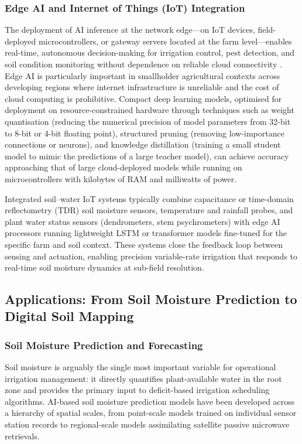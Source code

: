 \documentclass[land,article,submit,pdftex,moreauthors]{Definitions/mdpi}
\numberwithin{equation}{section}
\begin{document}
\subsubsection{Edge AI and Internet of Things (IoT) Integration}

The deployment of AI inference at the network edge---on IoT devices, field-deployed microcontrollers, or gateway servers located at the farm level---enables real-time, autonomous decision-making for irrigation control, pest detection, and soil condition monitoring without dependence on reliable cloud connectivity \citep{vij2020iot}. Edge AI is particularly important in smallholder agricultural contexts across developing regions where internet infrastructure is unreliable and the cost of cloud computing is prohibitive. Compact deep learning models, optimised for deployment on resource-constrained hardware through techniques such as weight quantisation (reducing the numerical precision of model parameters from 32-bit to 8-bit or 4-bit floating point), structured pruning (removing low-importance connections or neurons), and knowledge distillation (training a small student model to mimic the predictions of a large teacher model), can achieve accuracy approaching that of large cloud-deployed models while running on microcontrollers with kilobytes of RAM and milliwatts of power.

Integrated soil--water IoT systems typically combine capacitance or time-domain reflectometry (TDR) soil moisture sensors, temperature and rainfall probes, and plant water status sensors (dendrometers, stem psychrometers) with edge AI processors running lightweight LSTM or transformer models fine-tuned for the specific farm and soil context. These systems close the feedback loop between sensing and actuation, enabling precision variable-rate irrigation that responds to real-time soil moisture dynamics at sub-field resolution.

\subsection{Applications: From Soil Moisture Prediction to Digital Soil Mapping}

\subsubsection{Soil Moisture Prediction and Forecasting}

Soil moisture is arguably the single most important variable for operational irrigation management: it directly quantifies plant-available water in the root zone and provides the primary input to deficit-based irrigation scheduling algorithms. AI-based soil moisture prediction models have been developed across a hierarchy of spatial scales, from point-scale models trained on individual sensor station records to regional-scale models assimilating satellite passive microwave retrievals.
\end{document}
